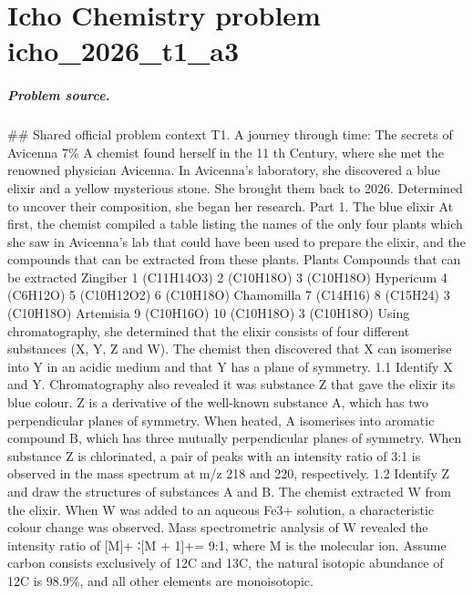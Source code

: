 
\chapter{Icho Chemistry problem icho\_2026\_t1\_a3}
\label{ch:IChO2026Problems_problem_icho_2026_t1_a3}

\paragraph{Problem source.}
\#\# Shared official problem context
T1. A journey through time: The secrets of Avicenna 7\% A chemist found herself in the 11 th Century, where she met the renowned physician Avicenna. In Avicenna's laboratory, she discovered a blue elixir and a yellow mysterious stone. She brought them back to 2026. Determined to uncover their composition, she began her research. Part 1. The blue elixir At first, the chemist compiled a table listing the names of the only four plants which she saw in Avicenna’s lab that could have been used to prepare the elixir, and the compounds that can be extracted from these plants. Plants Compounds that can be extracted Zingiber 1 (C11H14O3) 2 (C10H18O) 3 (C10H18O) Hypericum 4 (C6H12O) 5 (C10H12O2) 6 (C10H18O) Chamomilla 7 (C14H16) 8 (C15H24) 3 (C10H18O) Artemisia 9 (C10H16O) 10 (C10H18O) 3 (C10H18O) Using chromatography, she determined that the elixir consists of four different substances (X, Y, Z and W). The chemist then discovered that X can isomerise into Y in an acidic medium and that Y has a plane of symmetry. 1.1 Identify X and Y. Chromatography also revealed it was substance Z that gave the elixir its blue colour. Z is a derivative of the well-known substance A, which has two perpendicular planes of symmetry. When heated, A isomerises into aromatic compound B, which has three mutually perpendicular planes of symmetry. When substance Z is chlorinated, a pair of peaks with an intensity ratio of 3:1 is observed in the mass spectrum at m/z 218 and 220, respectively. 1.2 Identify Z and draw the structures of substances A and B. The chemist extracted W from the elixir. When W was added to an aqueous Fe3+ solution, a characteristic colour change was observed. Mass spectrometric analysis of W revealed the intensity ratio of [M]+ ∶[M + 1]+= 9:1, where M is the molecular ion. Assume carbon consists exclusively of 12C and 13C, the natural isotopic abundance of 12C is 98.9\%, and all other elements are monoisotopic.

